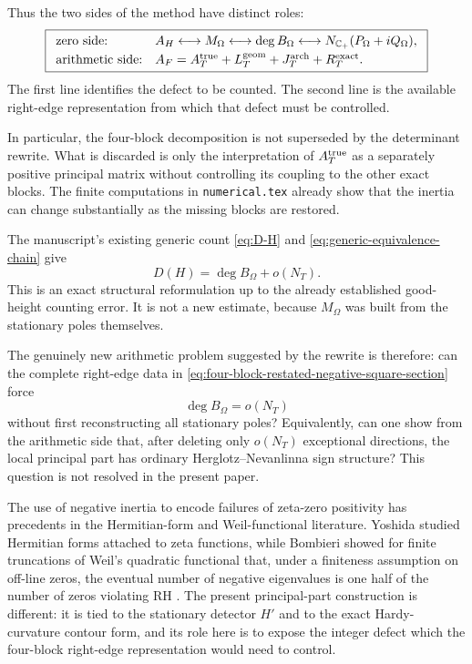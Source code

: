 Thus the two sides of the method have distinct roles:
\[
\boxed{
\begin{array}{ll}
\text{zero side:}
&
A_H\longleftrightarrow
M_\Omega\longleftrightarrow
\deg B_\Omega
\longleftrightarrow
N_{\mathbb C_+}(P_\Omega+iQ_\Omega),
\\[1mm]
\text{arithmetic side:}
&
A_F=
A_T^{\rm true}
+L_T^{\rm geom}
+J_T^{\rm arch}
+R_T^{\rm exact}.
\end{array}
}
\]
The first line identifies the defect to be counted.  The second line is the
available right-edge representation from which that defect must be controlled.

In particular, the four-block decomposition is not superseded by the
determinant rewrite.  What is discarded is only the interpretation of
$A_T^{\rm true}$ as a separately positive principal matrix without controlling
its coupling to the other exact blocks.  The finite computations in
\texttt{numerical.tex} already show that the inertia can change substantially
as the missing blocks are restored.

The manuscript's existing generic count
\eqref{eq:D-H} and \eqref{eq:generic-equivalence-chain} give
\begin{equation}
\boxed{
D(H)
=
\deg B_\Omega+o(N_T).
}
\label{eq:DH-Blaschke-degree}
\end{equation}
This is an exact structural reformulation up to the already established
good-height counting error.  It is not a new estimate, because
$M_\Omega$ was built from the stationary poles themselves.

The genuinely new arithmetic problem suggested by the rewrite is therefore:
can the complete right-edge data in
\eqref{eq:four-block-restated-negative-square-section} force
\begin{equation}
\boxed{
\deg B_\Omega=o(N_T)
}
\label{eq:Blaschke-target}
\end{equation}
without first reconstructing all stationary poles?  Equivalently, can one
show from the arithmetic side that, after deleting only $o(N_T)$ exceptional
directions, the local principal part has ordinary Herglotz--Nevanlinna sign
structure?  This question is not resolved in the present paper.

The use of negative inertia to encode failures of zeta-zero positivity has
precedents in the Hermitian-form and Weil-functional literature.  Yoshida
studied Hermitian forms attached to zeta functions, while Bombieri showed for
finite truncations of Weil's quadratic functional that, under a finiteness
assumption on off-line zeros, the eventual number of negative eigenvalues is
one half of the number of zeros violating RH
\cite{Yoshida1992,Bombieri2000}.  The present principal-part construction is
different: it is tied to the stationary detector $H'$ and to the exact
Hardy-curvature contour form, and its role here is to expose the integer defect
which the four-block right-edge representation would need to control.
